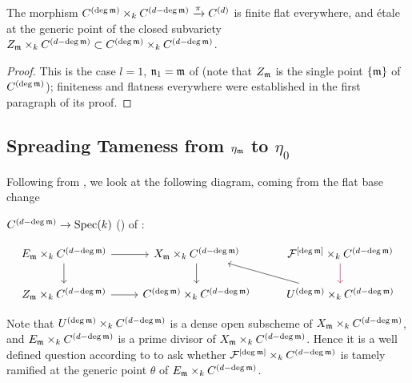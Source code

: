 \begin{cor}\label{cor:etale_at_generic_point}
     The morphism $C^{(\deg \mathfrak{m})} \times_k C^{(d - \deg \mathfrak{m})} \xrightarrow[]{\pi} C^{(d)}$
     is finite flat everywhere, and étale at the generic point of the closed subvariety
     $Z_{\mathfrak{m}} \times_k C^{(d - \deg \mathfrak{m})} \subset C^{(\deg \mathfrak{m})} \times_k C^{(d - \deg \mathfrak{m})}$.
\end{cor}
\begin{bluemath}
\begin{proof}
     This is the case $l = 1$, $\mathfrak{n}_1 = \mathfrak{m}$ of 
     (note that $Z_{\mathfrak{m}}$ is the single point $\{\mathfrak{m}\}$ of $C^{(\deg\mathfrak{m})}$);
     finiteness and flatness everywhere were established in the first
     paragraph of its proof.
\end{proof}
\end{bluemath}


\subsection{\texorpdfstring{Spreading Tameness from $\eta_{\mathfrak{m}}$ to $\eta_0$}{Spreading Tameness}}\label{subsection:spreading_tameness}

Following from , we look at the following diagram, coming from the flat base change

$C^{(d - \deg \mathfrak{m})} \to \operatorname{Spec}(k)$ () of :

\[\begin{tikzcd}
E_{\mdls} \times_k C^{(d-\deg \mdls)} \arrow[r] \arrow[d] & X_{\mdls} \times_k C^{(d-\deg \mdls)} \arrow[d] & \cF^{[\deg \mdls]} \times_k C^{(d-\deg \mdls)} \arrow[d, color=purple] \\
Z_\mdls \times_k C^{(d-\deg \mdls)} \arrow[r] & C^{(\deg \mdls)} \times_k C^{(d-\deg \mdls)} & U^{(\deg \mdls)} \times_k C^{(d-\deg \mdls)} \arrow[lu]
\end{tikzcd}\]

Note that $U^{(\deg \mathfrak{m})} \times_k C^{(d-\deg \mathfrak{m})}$ is a dense open subscheme of $X_{\mathfrak{m}} \times_k C^{(d-\deg \mathfrak{m})}$,
and $E_{\mathfrak{m}} \times_k C^{(d-\deg \mathfrak{m})}$ is a prime divisor of $X_{\mathfrak{m}} \times_k C^{(d-\deg \mathfrak{m})}$.
Hence it is a well defined question according to  to ask whether
$\mathcal{F}^{[\deg \mathfrak{m}]} \times_k C^{(d-\deg \mathfrak{m})}$ is tamely ramified at the generic point $\theta$ of
$E_{\mathfrak{m}} \times_k C^{(d-\deg \mathfrak{m})}$.

